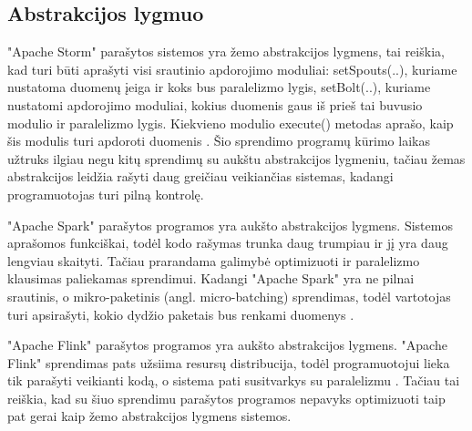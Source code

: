 \documentclass{VUMIFPSbakalaurinis}
\begin{document}
\subsection{Abstrakcijos lygmuo}

"Apache Storm" parašytos sistemos yra žemo abstrakcijos lygmens, tai reiškia, kad turi būti aprašyti visi srautinio apdorojimo moduliai: 
setSpouts(..), kuriame nustatoma duomenų įeiga ir koks bus paralelizmo lygis, setBolt(..), kuriame nustatomi apdorojimo moduliai, kokius duomenis gaus iš prieš tai buvusio modulio ir paralelizmo lygis. Kiekvieno modulio execute() metodas aprašo, kaip šis modulis turi apdoroti duomenis \cite{tutpoint}. Šio sprendimo programų kūrimo laikas užtruks ilgiau negu kitų sprendimų su aukštu abstrakcijos lygmeniu, tačiau žemas abstrakcijos leidžia rašyti daug greičiau veikiančias sistemas, kadangi programuotojas turi pilną kontrolę. \par

"Apache Spark" parašytos programos yra aukšto abstrakcijos lygmens. Sistemos aprašomos funkciškai, todėl kodo rašymas trunka daug trumpiau ir jį yra daug lengviau skaityti. Tačiau prarandama galimybė optimizuoti ir paralelizmo klausimas paliekamas sprendimui. Kadangi "Apache Spark" yra ne pilnai srautinis, o mikro-paketinis (angl. micro-batching) sprendimas, todėl vartotojas turi apsirašyti, kokio dydžio paketais bus renkami duomenys \cite{shoro2015big}. \par

"Apache Flink" parašytos programos yra aukšto abstrakcijos lygmens. "Apache Flink" sprendimas pats užsiima resursų distribucija, todėl programuotojui lieka tik parašyti veikianti kodą, o sistema pati susitvarkys su paralelizmu \cite{flinkdoc}. Tačiau tai reiškia, kad su šiuo sprendimu parašytos programos nepavyks optimizuoti taip pat gerai kaip žemo abstrakcijos lygmens sistemos. \par
\end{document}
